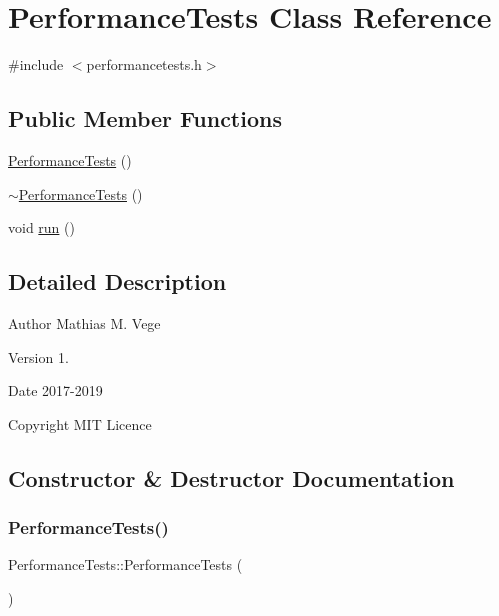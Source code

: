 \hypertarget{class_performance_tests}{}\section{Performance\+Tests Class Reference}
\label{class_performance_tests}


{\ttfamily \#include $<$performancetests.\+h$>$}

\subsection*{Public Member Functions}
\begin{DoxyCompactItemize}
\item 
\mbox{\hyperlink{class_performance_tests_ac8c32855dc70f74be063396bd6f76cf4}{Performance\+Tests}} ()
\item 
\mbox{\hyperlink{class_performance_tests_adc3a6beb9f16d8442cb9918dd2e9a8bb}{$\sim$\+Performance\+Tests}} ()
\item 
void \mbox{\hyperlink{class_performance_tests_aa55ebdbc84db93cc45adfdf7163f90b4}{run}} ()
\end{DoxyCompactItemize}


\subsection{Detailed Description}
\begin{DoxyAuthor}{Author}
Mathias M. Vege 
\end{DoxyAuthor}
\begin{DoxyVersion}{Version}
1. 
\end{DoxyVersion}
\begin{DoxyDate}{Date}
2017-\/2019 
\end{DoxyDate}
\begin{DoxyCopyright}{Copyright}
M\+IT Licence 
\end{DoxyCopyright}


\subsection{Constructor \& Destructor Documentation}
\mbox{\label{class_performance_tests_ac8c32855dc70f74be063396bd6f76cf4}} 
\subsubsection{\texorpdfstring{PerformanceTests()}{PerformanceTests()}}
{\footnotesize\ttfamily Performance\+Tests\+::\+Performance\+Tests (\begin{DoxyParamCaption}{ }\end{DoxyParamCaption})}

